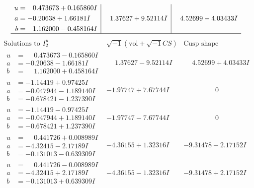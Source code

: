 \documentclass[1p]{elsarticle_modified}
\theoremstyle{definition}
\newcommand{\I}{\sqrt{-1}}
\begin{document}
$$\begin{array}{c|c|c}
\begin{aligned}
u &= \phantom{-}0.473673 + 0.165860 I \\
a &= -0.20638 + 1.66181 I \\
b &= \phantom{-}1.162000 - 0.458164 I\end{aligned}
 & \phantom{-}1.37627 + 9.52114 I & \phantom{-}4.52699 - 4.03433 I\\
 \hline 
 \end{array}$$\newpage$$\begin{array}{c|c|c}  
\text{Solutions to }I^u_{2}& \I (\text{vol} + \sqrt{-1}CS) & \text{Cusp shape}\\
 \hline 
\begin{aligned}
u &= \phantom{-}0.473673 - 0.165860 I \\
a &= -0.20638 - 1.66181 I \\
b &= \phantom{-}1.162000 + 0.458164 I\end{aligned}
 & \phantom{-}1.37627 - 9.52114 I & \phantom{-}4.52699 + 4.03433 I \\ \hline\begin{aligned}
u &= -1.14419 + 0.97425 I \\
a &= -0.047944 - 1.189140 I \\
b &= -0.678421 - 1.237390 I\end{aligned}
 & -1.97747 + 7.67744 I & \phantom{-0.000000 } 0 \\ \hline\begin{aligned}
u &= -1.14419 - 0.97425 I \\
a &= -0.047944 + 1.189140 I \\
b &= -0.678421 + 1.237390 I\end{aligned}
 & -1.97747 - 7.67744 I & \phantom{-0.000000 } 0 \\ \hline\begin{aligned}
u &= \phantom{-}0.441726 + 0.008989 I \\
a &= -4.32415 - 2.17189 I \\
b &= -0.131013 - 0.639309 I\end{aligned}
 & -4.36155 + 1.32316 I & -9.31478 - 2.17152 I \\ \hline\begin{aligned}
u &= \phantom{-}0.441726 - 0.008989 I \\
a &= -4.32415 + 2.17189 I \\
b &= -0.131013 + 0.639309 I\end{aligned}
 & -4.36155 - 1.32316 I & -9.31478 + 2.17152 I \\ \hline\begin{aligned}

\end{aligned}
\end{array}$$
\end{document}
